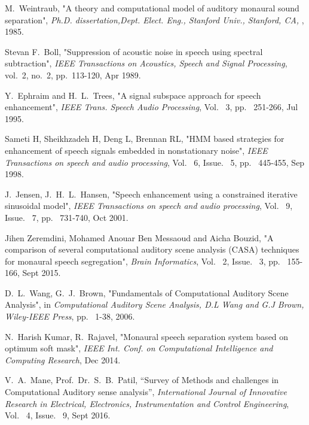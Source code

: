 \documentclass[a4paper]{article}
\begin{document}




 \begin{thebibliography}{9}

M.\ Weintraub,
"A theory and computational model of auditory monaural sound separation",
\textit{Ph.D. dissertation,Dept. Elect. Eng., Stanford Univ., Stanford, CA, },  1985.
	
Stevan F.\ Boll,
"Suppression of acoustic noise in speech using spectral subtraction",
\textit{IEEE Transactions on Acoustics, Speech and Signal Processing}, vol.~2, no.~2, pp.~113-120, Apr 1989.

Y.\ Ephraim and H.\ L.\ Trees, "A signal subspace approach for speech enhancement", \textit{IEEE Trans. Speech Audio Processing}, Vol. ~3, pp. ~251-266, Jul 1995.     

Sameti H, Sheikhzadeh H, Deng L, Brennan RL, "HMM based strategies for enhancement of speech signals embedded in nonstationary noise", \textit{IEEE Transactions on speech and audio processing}, Vol. ~6, Issue. ~5, pp. ~445-455, Sep 1998.

J.\ Jensen, J.\ H.\ L.\ Hansen,  "Speech enhancement using a constrained iterative sinusoidal model", \textit{IEEE Transactions on speech and audio processing}, Vol. ~9, Issue. ~7, pp. ~731-740, Oct 2001.

Jihen Zeremdini, Mohamed Anouar Ben Messaoud and Aicha Bouzid, "A comparison of several computational auditory scene analysis (CASA) techniques for monaural speech segregation", \textit{Brain Informatics}, Vol. ~2, Issue. ~3, pp. ~155-166, Sept 2015.

D.\ L.\ Wang, G.\ J.\ Brown, "Fundamentals of Computational Auditory Scene Analysis", in \textit{Computational Auditory Scene Analysis, D.L Wang and G.J Brown, Wiley-IEEE Press}, pp. ~1-38, 2006.           

N.\ Harish Kumar, R.\ Rajavel, "Monaural speech separation system based on optimum soft mask", \textit{IEEE Int. Conf. on Computational Intelligence and Computing Research}, Dec 2014. 

V.\ A.\ Mane, Prof.\  Dr.\ S.\ B.\ Patil, “Survey of Methods and challenges in Computational Auditory sense analysis”, \textit{ International Journal of Innovative Research in Electrical, Electronics, Instrumentation and Control Engineering}, Vol. ~4, Issue. ~9, Sept 2016.            


\end{thebibliography}
\end{document}
